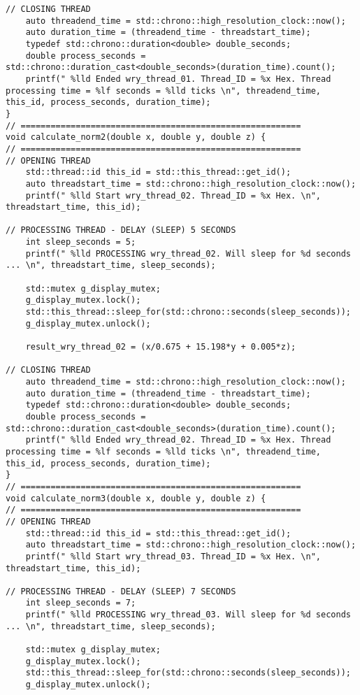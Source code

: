 \begin{lstlisting}[caption={App4-C++2011 Example Parallel Multithreading}, label=App4-C++2011 Example Parallel Multithreading]
// CLOSING THREAD
	auto threadend_time = std::chrono::high_resolution_clock::now();
	auto duration_time = (threadend_time - threadstart_time);
	typedef std::chrono::duration<double> double_seconds;
	double process_seconds = std::chrono::duration_cast<double_seconds>(duration_time).count();
	printf(" %lld Ended wry_thread_01. Thread_ID = %x Hex. Thread processing time = %lf seconds = %lld ticks \n", threadend_time, this_id, process_seconds, duration_time);
}
// ======================================================== 
void calculate_norm2(double x, double y, double z) {
// ========================================================
// OPENING THREAD
	std::thread::id this_id = std::this_thread::get_id();
	auto threadstart_time = std::chrono::high_resolution_clock::now();
	printf(" %lld Start wry_thread_02. Thread_ID = %x Hex. \n", threadstart_time, this_id);

// PROCESSING THREAD - DELAY (SLEEP) 5 SECONDS
	int sleep_seconds = 5;
	printf(" %lld PROCESSING wry_thread_02. Will sleep for %d seconds ... \n", threadstart_time, sleep_seconds);
	
	std::mutex g_display_mutex;
	g_display_mutex.lock();
	std::this_thread::sleep_for(std::chrono::seconds(sleep_seconds));
	g_display_mutex.unlock();
	
	result_wry_thread_02 = (x/0.675 + 15.198*y + 0.005*z);    

// CLOSING THREAD
	auto threadend_time = std::chrono::high_resolution_clock::now();
	auto duration_time = (threadend_time - threadstart_time);
	typedef std::chrono::duration<double> double_seconds;
	double process_seconds = std::chrono::duration_cast<double_seconds>(duration_time).count();
	printf(" %lld Ended wry_thread_02. Thread_ID = %x Hex. Thread processing time = %lf seconds = %lld ticks \n", threadend_time, this_id, process_seconds, duration_time);
}
// ======================================================== 
void calculate_norm3(double x, double y, double z) {
// ========================================================
// OPENING THREAD
	std::thread::id this_id = std::this_thread::get_id();
	auto threadstart_time = std::chrono::high_resolution_clock::now();
	printf(" %lld Start wry_thread_03. Thread_ID = %x Hex. \n", threadstart_time, this_id);

// PROCESSING THREAD - DELAY (SLEEP) 7 SECONDS
	int sleep_seconds = 7;
	printf(" %lld PROCESSING wry_thread_03. Will sleep for %d seconds ... \n", threadstart_time, sleep_seconds);
	
	std::mutex g_display_mutex;
	g_display_mutex.lock();
	std::this_thread::sleep_for(std::chrono::seconds(sleep_seconds));
	g_display_mutex.unlock();
	

\end{lstlisting}

